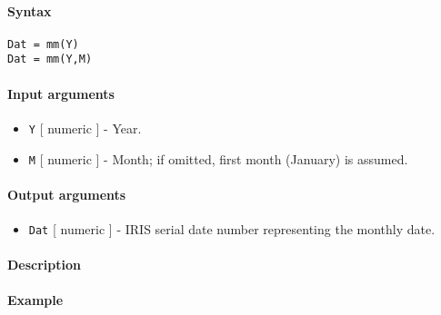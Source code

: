 


	\paragraph{Syntax}\label{syntax}

\begin{verbatim}
Dat = mm(Y)
Dat = mm(Y,M)
\end{verbatim}

\paragraph{Input arguments}\label{input-arguments}

\begin{itemize}
\item
  \texttt{Y} {[} numeric {]} - Year.
\item
  \texttt{M} {[} numeric {]} - Month; if omitted, first month (January)
  is assumed.
\end{itemize}

\paragraph{Output arguments}\label{output-arguments}

\begin{itemize}
\itemsep1pt\parskip0pt
\item
  \texttt{Dat} {[} numeric {]} - IRIS serial date number representing
  the monthly date.
\end{itemize}

\paragraph{Description}\label{description}

\paragraph{Example}\label{example}


